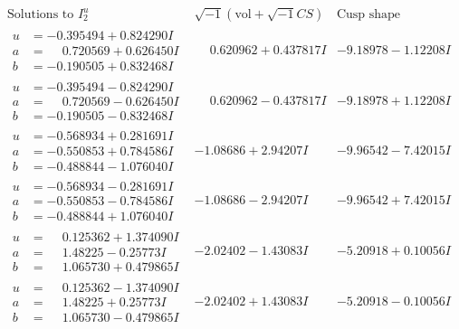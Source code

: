 \documentclass[1p]{elsarticle_modified}
\theoremstyle{definition}
\newcommand{\I}{\sqrt{-1}}
\begin{document}
$$\begin{array}{c|c|c}  
\text{Solutions to }I^u_{2}& \I (\text{vol} + \sqrt{-1}CS) & \text{Cusp shape}\\
 \hline 
\begin{aligned}
u &= -0.395494 + 0.824290 I \\
a &= \phantom{-}0.720569 + 0.626450 I \\
b &= -0.190505 + 0.832468 I\end{aligned}
 & \phantom{-}0.620962 + 0.437817 I & -9.18978 - 1.12208 I \\ \hline\begin{aligned}
u &= -0.395494 - 0.824290 I \\
a &= \phantom{-}0.720569 - 0.626450 I \\
b &= -0.190505 - 0.832468 I\end{aligned}
 & \phantom{-}0.620962 - 0.437817 I & -9.18978 + 1.12208 I \\ \hline\begin{aligned}
u &= -0.568934 + 0.281691 I \\
a &= -0.550853 + 0.784586 I \\
b &= -0.488844 - 1.076040 I\end{aligned}
 & -1.08686 + 2.94207 I & -9.96542 - 7.42015 I \\ \hline\begin{aligned}
u &= -0.568934 - 0.281691 I \\
a &= -0.550853 - 0.784586 I \\
b &= -0.488844 + 1.076040 I\end{aligned}
 & -1.08686 - 2.94207 I & -9.96542 + 7.42015 I \\ \hline\begin{aligned}
u &= \phantom{-}0.125362 + 1.374090 I \\
a &= \phantom{-}1.48225 - 0.25773 I \\
b &= \phantom{-}1.065730 + 0.479865 I\end{aligned}
 & -2.02402 - 1.43083 I & -5.20918 + 0.10056 I \\ \hline\begin{aligned}
u &= \phantom{-}0.125362 - 1.374090 I \\
a &= \phantom{-}1.48225 + 0.25773 I \\
b &= \phantom{-}1.065730 - 0.479865 I\end{aligned}
 & -2.02402 + 1.43083 I & -5.20918 - 0.10056 I \\ \hline\begin{aligned}

\end{aligned}
\end{array}$$
\end{document}
